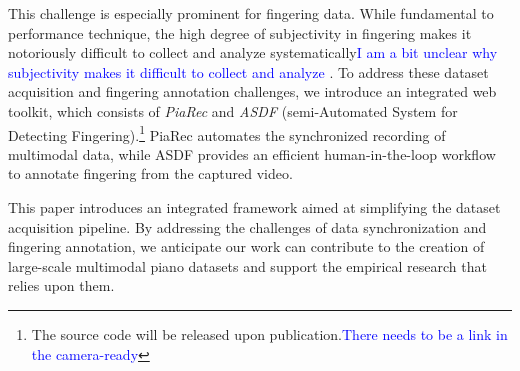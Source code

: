 \documentclass{article}
\newcommand{\alex}[1]{\textcolor{blue}{#1}}%
\begin{document}
This challenge is especially prominent for fingering data. While fundamental to performance technique, the high degree of subjectivity in fingering makes it notoriously difficult to collect and analyze systematically\alex{I am a bit unclear why subjectivity makes it difficult to collect and analyze} \cite{swinkin2007keyboard}. To address these dataset acquisition and fingering annotation challenges, we introduce an integrated web toolkit, which consists of \textit{PiaRec} and \textit{ASDF} (semi-Automated System for Detecting Fingering).\footnote{The source code will be released upon publication.\alex{There needs to be a link in the camera-ready}} PiaRec automates the synchronized recording of multimodal data, while ASDF provides an efficient human-in-the-loop workflow to annotate fingering from the captured video.

This paper introduces an integrated framework aimed at simplifying the dataset acquisition pipeline. By addressing the challenges of  data synchronization and fingering annotation, we anticipate our work can contribute to the creation of large-scale multimodal piano datasets and support the empirical research that relies upon them.



\end{document}
